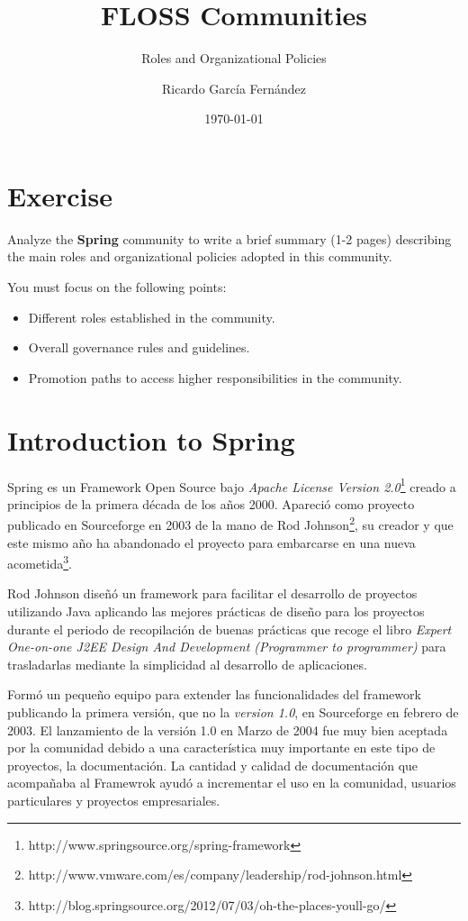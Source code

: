 \documentclass[11pt]{scrartcl}
\title{\textbf{FLOSS Communities}}
\subtitle{Roles and Organizational Policies}
\author{Ricardo Garc\'ia Fern\'andez}
\date{\today}
\begin{document}
\maketitle

\section{Exercise}

Analyze the \textbf{Spring} community to write a brief summary (1-2 pages) describing the main roles and organizational policies adopted in this community.

You must focus on the following points:

\begin{itemize}
    \item Different roles established in the community.
    \item Overall governance rules and guidelines.
    \item Promotion paths to access higher responsibilities in the community.
\end{itemize}

\section{Introduction to Spring}

Spring es un Framework Open Source bajo \emph{Apache License Version 2.0}\footnote{http://www.springsource.org/spring-framework} creado a principios de la primera d\'ecada de los a\~nos 2000. Apareci\'o como proyecto publicado en Sourceforge en 2003 de la mano de Rod Johnson\footnote{http://www.vmware.com/es/company/leadership/rod-johnson.html}, su creador y que este mismo a\~no ha abandonado el proyecto para embarcarse en una nueva acometida\footnote{http://blog.springsource.org/2012/07/03/oh-the-places-youll-go/}.

Rod Johnson dise\~n\'o un framework para facilitar el desarrollo de proyectos utilizando Java aplicando las mejores pr\'acticas de dise\~no para los proyectos durante el periodo de recopilaci\'on de buenas pr\'acticas que recoge el libro \emph{Expert One-on-one J2EE Design And Development (Programmer to programmer)} para trasladarlas mediante la simplicidad al desarrollo de aplicaciones.

Form\'o un peque\~no equipo para extender las funcionalidades del framework publicando la primera versi\'on, que no la \emph{version 1.0}, en Sourceforge en febrero de 2003. El lanzamiento de la versi\'on 1.0 en Marzo de 2004 fue muy bien aceptada por la comunidad debido a una caracter\'istica muy importante en este tipo de proyectos, la documentaci\'on. La cantidad y calidad de documentaci\'on que acompa\~naba al Framewrok ayud\'o a incrementar el uso en la comunidad, usuarios particulares y proyectos empresariales.
\end{document}
